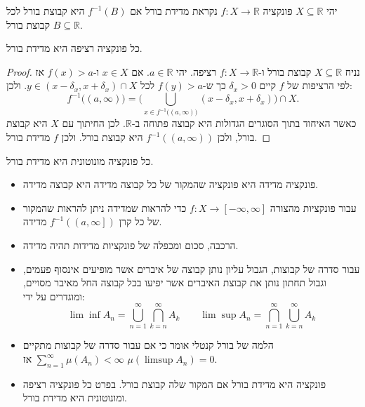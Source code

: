 \documentclass{tstextbook}
\begin{document}
\begin{definition}
יהי \(X\subseteq \mathbb{R}\) פונקציה \(f:X\to \mathbb{R}\) נקראת מדידת בורל אם \(f^{-1}(B)\) היא קבוצת בורל לכל קבוצת בורל \(B\subseteq \mathbb{R}\).

\end{definition}
\begin{proposition}
כל פונקציה רציפה היא מדידת בורל.

\end{proposition}
\begin{proof}
נניח \(X \subseteq \mathbb{R}\) קבוצת בורל ו-\(f:X\to \mathbb{R}\) רציפה. יהי \(a \in \mathbb{R}\). אם \(x \in X\) ו-\(f(x)> a\) אז לפי הרציפות של \(f\) קיים \(\delta_{x}> 0\) כך ש-\(f(y)> a\) לכל \(y \in \left( x-\delta_{x},x+\delta _{x} \right)\cap X\). ולכן:
$$f^{-1}\big((a,\infty)\big)=\Big(\bigcup_{x\in f^{-1}\big((a,\infty)\big)}(x-\delta_{x},x+\delta_{x})\Big)\cap X.$$
כאשר האיחוד בתוך הסוגרים הגדולות היא קבוצה פתוחה ב-\(\mathbb{R}\). לכן החיתוך עם \(X\) היא קבוצת בורל, ולכן \(f^{-1}\left( \left( a,\infty \right) \right)\) היא קבוצת בורל. ולכן \(f\) מדידת בורל.

\end{proof}
\begin{proposition}
כל פונקציה מונוטונית היא מדידת בורל.

\end{proposition}
\begin{summary}
  \begin{itemize}
    \item פונקציה מדידה היא פונקציה שהמקור של כל קבוצה מדידה היא קבוצה מדידה.
    \item עבור פונקציות מהצורה \(f:X\to \left[ -\infty,\infty \right]\) כדי להראות שמדידה ניתן להראות שהמקור של כל קרן \(f^{-1}\left( \left( a,\infty \right] \right)\) מדידה.
    \item הרכבה, סכום ומכפלה של פונקציות מדידות תהיה מדידה.
    \item עבור סדרה של קבוצות, הגבול עליון נותן קבוצה של איברים אשר מופיעים אינסוף פעמים, וגבול תחתון נותן את קבוצת האיברים אשר יפיעו בכל קבוצה החל מאיבר מסויים, ומוגדרים על ידי:
$$\operatorname*{lim}\operatorname*{inf}A_{n}=\bigcup_{n=1}^{\infty}\bigcap_{k=n}^{\infty}A_{k}\qquad \operatorname*{lim}\operatorname*{sup}A_{n}=\bigcap_{n=1}^{\infty}\bigcup_{k=n}^{\infty}A_{k}$$
    \item הלמה של בורל קנטלי אומר כי אם עבור סדרה של קבוצות מתקיים \(\sum_{n=1}^{\infty}\mu\left(A_{n}\right)<\infty\) אז \(\mu(\limsup A_{n})=0\).
    \item פונקציה היא מדידת בורל אם המקור שלה קבוצת בורל. בפרט כל פונקציה רציפה ומונוטונית היא מדידת בורל.
  \end{itemize}
\end{summary}
\end{document}
